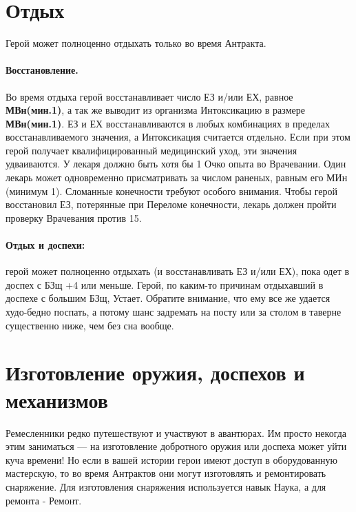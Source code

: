\section{Отдых}
Герой может полноценно отдыхать только во время Антракта.
\tbd

\paragraph{Восстановление.} Во время отдыха герой восстанавливает число ЕЗ и/или ЕХ, равное \textbf{МВн(мин.1)}, а так же выводит из организма Интоксикацию в размере \textbf{МВн(мин.1)}. ЕЗ и ЕХ восстанавливаются в любых комбинациях в пределах восстанавливаемого значения, а Интоксикация считается отдельно.
\newline Если при этом герой получает квалифицированный медицинский уход, эти значения удваиваются. У лекаря должно быть хотя бы 1 Очко опыта во Врачевании. Один лекарь может одновременно присматривать за числом раненых, равным его МИн (минимум 1).
\newline Сломанные конечности требуют особого внимания. Чтобы герой восстановил ЕЗ, потерянные при Переломе конечности, лекарь должен пройти проверку Врачевания против 15.
\paragraph{Отдых и доспехи:} герой может полноценно отдыхать (и восстанавливать ЕЗ и/или ЕХ), пока одет в доспех с БЗщ +4 или меньше. Герой, по каким-то причинам отдыхавший в доспехе с большим БЗщ, Устает. Обратите внимание, что ему все же удается худо-бедно поспать, а потому шанс задремать на посту или за столом в таверне существенно ниже, чем без сна вообще.
\section{Изготовление оружия, доспехов и механизмов}
Ремесленники редко путешествуют и участвуют в авантюрах. Им просто некогда этим заниматься — на изготовление добротного оружия или доспеха может уйти куча времени! Но если в вашей истории герои имеют доступ в оборудованную мастерскую, то во время Антрактов они могут изготовлять и ремонтировать снаряжение. Для изготовления снаряжения используется навык Наука, а для ремонта - Ремонт.
